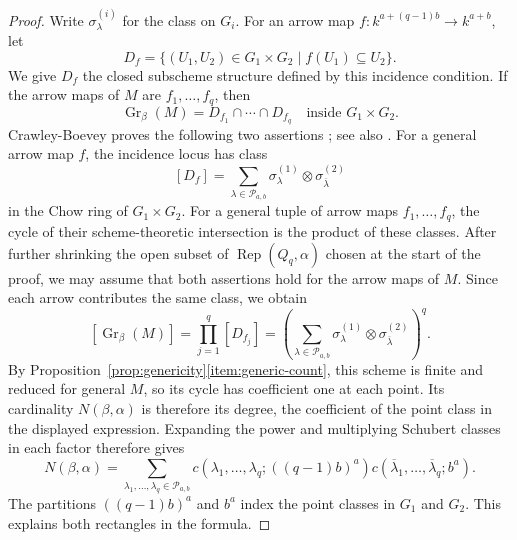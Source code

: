 \documentclass[a4paper,reqno,10pt]{amsart}
\theoremstyle{definition}
\numberwithin{equation}{section}
\newcommand{\Gr}{\operatorname{Gr}}
\newcommand{\Rep}{\operatorname{Rep}}
\newcommand{\parts}{\mathcal P}
\begin{document}
\begin{proof}
Write $\sigma_\lambda^{(i)}$ for the class on $G_i$.
For an arrow map
$f:k^{a+(q-1)b}\to k^{a+b}$, let
\[
 D_f=\{(U_1,U_2)\in G_1\times G_2\mid f(U_1)\subseteq U_2\}.
\]
We give $D_f$ the closed subscheme structure defined by this incidence condition.
If the arrow maps of $M$ are $f_1,\ldots,f_q$, then
\[
 \Gr_\beta(M)=D_{f_1}\cap\cdots\cap D_{f_q}
 \quad\text{inside }G_1\times G_2.
\]
Crawley-Boevey proves the following two assertions
\cite[Theorem and proof, p.~365]{CB}; see also
\cite[Proposition~3]{DSW}. For a general arrow map $f$, the incidence
locus has class
\[
 [D_f]=\sum_{\lambda\in\parts_{a,b}}
       \sigma_\lambda^{(1)}\otimes\sigma_{\overline\lambda}^{(2)}
\]
in the Chow ring of $G_1\times G_2$. For a general tuple of arrow
maps $f_1,\ldots,f_q$, the cycle of their scheme-theoretic intersection
is the product of these classes. After further shrinking the open subset
of $\Rep(Q_q,\alpha)$ chosen at the start of the proof, we may assume
that both assertions hold for the arrow maps of $M$.
Since each arrow contributes the
same class, we obtain
\[
 [\Gr_\beta(M)]=\prod_{j=1}^q[D_{f_j}]
 =\left(\sum_{\lambda\in\parts_{a,b}}
       \sigma_\lambda^{(1)}\otimes\sigma_{\overline\lambda}^{(2)}\right)^q.
\]
By Proposition~\ref{prop:genericity}\ref{item:generic-count}, this
scheme is finite and reduced for general $M$, so its cycle has
coefficient one at each point. Its cardinality $N(\beta,\alpha)$ is therefore
its degree, the coefficient of the point class in the displayed expression.
Expanding the power and multiplying Schubert classes in each factor
therefore gives
\begin{equation}\label{eq:dsw-count}
 N(\beta,\alpha)=
 \sum_{\lambda_1,\ldots,\lambda_q\in\parts_{a,b}}
 c(\lambda_1,\ldots,\lambda_q;((q-1)b)^a)
 c(\overline\lambda_1,\ldots,\overline\lambda_q;b^a).
\end{equation}
The partitions $((q-1)b)^a$ and $b^a$ index the point classes in
$G_1$ and $G_2$. This explains both rectangles in the formula.


\end{proof}
\end{document}
